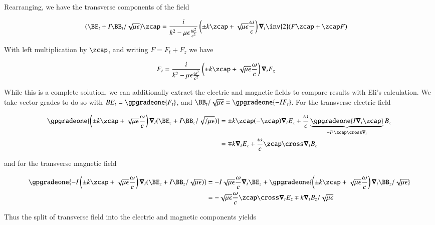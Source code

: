 Rearranging, we have the transverse components of the field

\begin{align}\label{eqn:blah10}
(\BE_t + I \BB_t/\sqrt{\mu\epsilon}) \zcap &=
\frac{i}{k^2 - \mu\epsilon\frac{\omega^2}{c^2}} \left( \pm k \zcap + \sqrt{\mu\epsilon}\frac{\omega}{c}\right) \spacegrad_t \inv{2}( F \zcap + \zcap F) 
\end{align}

With left multiplication by $\zcap$, and writing $F = F_t + F_z$ we have

\begin{align}\label{eqn:transverseBoth}
F_t &= \frac{i}{k^2 - \mu\epsilon\frac{\omega^2}{c^2}} \left( \pm k \zcap + \sqrt{\mu\epsilon}\frac{\omega}{c}\right) \spacegrad_t F_z
\end{align}

While this is a complete solution, we can additionally extract the electric and magnetic fields to compare results with Eli's calculation.  We take 
vector grades to do so with $BE_t = \gpgradeone{F_t}$, and $\BB_t/\sqrt{\mu\epsilon} = \gpgradeone{-I F_t}$.   For the transverse electric field

\begin{align*}
\gpgradeone{ \left( \pm k \zcap + \sqrt{\mu\epsilon}\frac{\omega}{c}\right) \spacegrad_t (\BE_z + I \BB_z/\sqrt{/\mu\epsilon}) } 
&=
\pm k \zcap (-\zcap) \spacegrad_t E_z + \frac{\omega}{c} \underbrace{\gpgradeone{I \spacegrad_t \zcap}}_{-I^2 \zcap \cross \spacegrad_t } B_z \\
&=
\mp k \spacegrad_t E_z + \frac{\omega}{c} \zcap \cross \spacegrad_t B_z \\
\end{align*}

and for the transverse magnetic field

\begin{align*}
\gpgradeone{ -I \left( \pm k \zcap + \sqrt{\mu\epsilon}\frac{\omega}{c}\right) \spacegrad_t (\BE_z + I \BB_z/\sqrt{\mu\epsilon}) } 
&=
-I \sqrt{\mu\epsilon}\frac{\omega}{c} \spacegrad_t \BE_z
+\gpgradeone{ \left( \pm k \zcap + \sqrt{\mu\epsilon}\frac{\omega}{c}\right) \spacegrad_t \BB_z/\sqrt{\mu\epsilon} }  \\
&=
- \sqrt{\mu\epsilon}\frac{\omega}{c} \zcap \cross \spacegrad_t E_z
\mp k \spacegrad_t B_z/\sqrt{\mu\epsilon} \\
\end{align*}

Thus the split of transverse field into the electric and magnetic components yields

